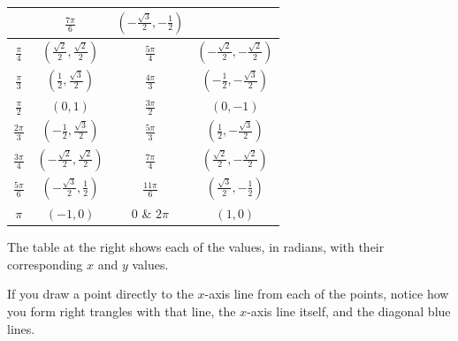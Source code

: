 \begin{center}
\begin{minipage}[c]{0.54\linewidth}
\begin{tabular}{ c | c | c | c }
                        & $\frac{7\pi}{6}$ & $\left(-\frac{\sqrt{3}}{2}, -\frac{1}{2} \right)$ \\
                        \hline
                        $\frac{\pi}{4}$ & $\left(\frac{\sqrt{2}}{2}, \frac{\sqrt{2}}{2} \right)$ 
                        & $\frac{5\pi}{4}$ & $\left(-\frac{\sqrt{2}}{2}, -\frac{\sqrt{2}}{2} \right)$ \\
                        \hline
                        $\frac{\pi}{3}$ & $\left(\frac{1}{2}, \frac{\sqrt{3}}{2} \right)$ 
                        & $\frac{4\pi}{3}$ & $\left(-\frac{1}{2}, -\frac{\sqrt{3}}{2} \right)$ \\
                        \hline
                        $\frac{\pi}{2}$ & $\left(0, 1 \right)$ 
                        & $\frac{3\pi}{2}$ & $\left(0, -1 \right)$ \\
                        \hline
                        $\frac{2\pi}{3}$ & $\left(-\frac{1}{2}, \frac{\sqrt{3}}{2} \right)$ 
                        & $\frac{5\pi}{3}$ & $\left(\frac{1}{2}, -\frac{\sqrt{3}}{2} \right)$ \\
                        \hline
                        $\frac{3\pi}{4}$ & $\left(-\frac{\sqrt{2}}{2}, \frac{\sqrt{2}}{2} \right)$ 
                        & $\frac{7\pi}{4}$ & $\left(\frac{\sqrt{2}}{2}, -\frac{\sqrt{2}}{2} \right)$ \\
                        \hline
                        $\frac{5\pi}{6}$ & $\left(-\frac{\sqrt{3}}{2}, \frac{1}{2} \right)$ 
                        & $\frac{11\pi}{6}$ & $\left(\frac{\sqrt{3}}{2}, -\frac{1}{2} \right)$ \\
                        \hline
                        $\pi$ & $\left(-1, 0 \right)$ & $0$ \& $2\pi$ 
                        & $\left(1, 0 \right)$ \\
                \end{tabular}
        \end{minipage}
\end{center}
The table at the right shows each of the values, in radians, with their corresponding $x$ and $y$ values.

If you draw a point directly to the $x$-axis line from each of the points, notice how you form right trangles with that line, the $x$-axis line itself, and the diagonal blue lines.